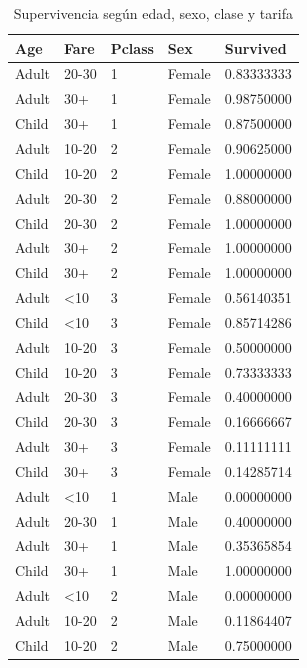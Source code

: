 \begin{table}[H]
	\centering
	\caption{Supervivencia según edad, sexo, clase y tarifa}
	\label{tab:age-sex-fare-pclass}
	\begin{tabular}{|llll|l|}
		\hline
		Age   & Fare        & Pclass & Sex    & Survived   \\ \hline
		Adult & 20-30       & 1      & Female & 0.83333333 \\
		Adult & 30+         & 1      & Female & 0.98750000 \\
		Child & 30+         & 1      & Female & 0.87500000 \\
		Adult & 10-20       & 2      & Female & 0.90625000 \\
		Child & 10-20       & 2      & Female & 1.00000000 \\
		Adult & 20-30       & 2      & Female & 0.88000000 \\
		Child & 20-30       & 2      & Female & 1.00000000 \\
		Adult & 30+         & 2      & Female & 1.00000000 \\
		Child & 30+         & 2      & Female & 1.00000000 \\
		Adult & \textless10 & 3      & Female & 0.56140351 \\
		Child & \textless10 & 3      & Female & 0.85714286 \\
		Adult & 10-20       & 3      & Female & 0.50000000 \\
		Child & 10-20       & 3      & Female & 0.73333333 \\
		Adult & 20-30       & 3      & Female & 0.40000000 \\
		Child & 20-30       & 3      & Female & 0.16666667 \\
		Adult & 30+         & 3      & Female & 0.11111111 \\
		Child & 30+         & 3      & Female & 0.14285714 \\
		Adult & \textless10 & 1      & Male   & 0.00000000 \\
		Adult & 20-30       & 1      & Male   & 0.40000000 \\
		Adult & 30+         & 1      & Male   & 0.35365854 \\
		Child & 30+         & 1      & Male   & 1.00000000 \\
		Adult & \textless10 & 2      & Male   & 0.00000000 \\
		Adult & 10-20       & 2      & Male   & 0.11864407 \\
		Child & 10-20       & 2      & Male   & 0.75000000 \\

\end{tabular}
\end{table}

